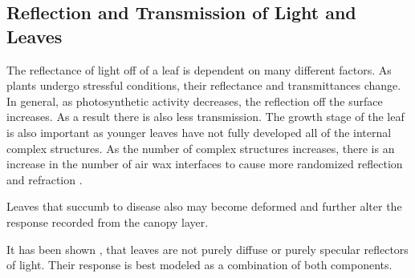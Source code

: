 \subsection{Reflection and Transmission of Light and Leaves}

The reflectance of light off of a leaf is dependent on many different factors.  As plants undergo stressful conditions, their reflectance and transmittances change.  In general, as photosynthetic activity decreases, the reflection off the surface increases.  As a result there is also less transmission.  The growth stage of the leaf is also important as younger leaves have not fully developed all of the internal complex structures.  As the number of complex structures increases, there is an increase in the number of air wax interfaces to cause more randomized reflection and refraction \cite{photonvegetation}.

Leaves that succumb to disease also may become deformed and further alter the response recorded from the canopy layer.

It has been shown \cite{grant}, \cite{specularbrdf} that leaves are not purely diffuse or purely specular reflectors of light.  Their response is best modeled as a combination of both components.
